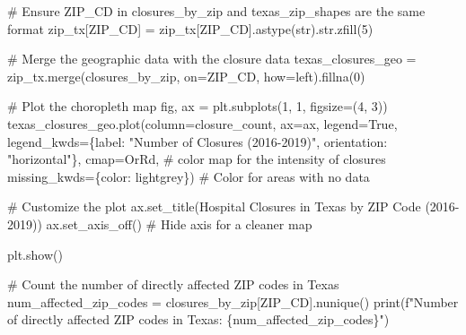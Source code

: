 \documentclass[
  letterpaper,
  DIV=11,
  numbers=noendperiod]{scrartcl}
\newenvironment{Shaded}{\begin{snugshade}}{\end{snugshade}}
\newcommand{\BuiltInTok}[1]{\textcolor[rgb]{0.00,0.23,0.31}{#1}}
\newcommand{\CommentTok}[1]{\textcolor[rgb]{0.37,0.37,0.37}{#1}}
\newcommand{\DecValTok}[1]{\textcolor[rgb]{0.68,0.00,0.00}{#1}}
\newcommand{\NormalTok}[1]{\textcolor[rgb]{0.00,0.23,0.31}{#1}}
\newcommand{\OperatorTok}[1]{\textcolor[rgb]{0.37,0.37,0.37}{#1}}
\newcommand{\SpecialCharTok}[1]{\textcolor[rgb]{0.37,0.37,0.37}{#1}}
\newcommand{\SpecialStringTok}[1]{\textcolor[rgb]{0.13,0.47,0.30}{#1}}
\newcommand{\StringTok}[1]{\textcolor[rgb]{0.13,0.47,0.30}{#1}}
\newcommand{\VariableTok}[1]{\textcolor[rgb]{0.07,0.07,0.07}{#1}}
\begin{document}
\begin{Shaded}
\begin{Highlighting}[]
\CommentTok{\# Ensure ZIP\_CD in closures\_by\_zip and texas\_zip\_shapes are the same format}
\NormalTok{zip\_tx[}\StringTok{\textquotesingle{}ZIP\_CD\textquotesingle{}}\NormalTok{] }\OperatorTok{=}\NormalTok{ zip\_tx[}\StringTok{\textquotesingle{}ZIP\_CD\textquotesingle{}}\NormalTok{].astype(}\BuiltInTok{str}\NormalTok{).}\BuiltInTok{str}\NormalTok{.zfill(}\DecValTok{5}\NormalTok{)}

\CommentTok{\# Merge the geographic data with the closure data}
\NormalTok{texas\_closures\_geo }\OperatorTok{=}\NormalTok{ zip\_tx.merge(closures\_by\_zip, on}\OperatorTok{=}\StringTok{\textquotesingle{}ZIP\_CD\textquotesingle{}}\NormalTok{, how}\OperatorTok{=}\StringTok{\textquotesingle{}left\textquotesingle{}}\NormalTok{).fillna(}\DecValTok{0}\NormalTok{)}

\CommentTok{\# Plot the choropleth map}
\NormalTok{fig, ax }\OperatorTok{=}\NormalTok{ plt.subplots(}\DecValTok{1}\NormalTok{, }\DecValTok{1}\NormalTok{, figsize}\OperatorTok{=}\NormalTok{(}\DecValTok{4}\NormalTok{, }\DecValTok{3}\NormalTok{))}
\NormalTok{texas\_closures\_geo.plot(column}\OperatorTok{=}\StringTok{\textquotesingle{}closure\_count\textquotesingle{}}\NormalTok{, ax}\OperatorTok{=}\NormalTok{ax, legend}\OperatorTok{=}\VariableTok{True}\NormalTok{,}
\NormalTok{                        legend\_kwds}\OperatorTok{=}\NormalTok{\{}\StringTok{\textquotesingle{}label\textquotesingle{}}\NormalTok{: }\StringTok{"Number of Closures (2016{-}2019)"}\NormalTok{, }\StringTok{\textquotesingle{}orientation\textquotesingle{}}\NormalTok{: }\StringTok{"horizontal"}\NormalTok{\},}
\NormalTok{                        cmap}\OperatorTok{=}\StringTok{\textquotesingle{}OrRd\textquotesingle{}}\NormalTok{,  }\CommentTok{\# color map for the intensity of closures}
\NormalTok{                        missing\_kwds}\OperatorTok{=}\NormalTok{\{}\StringTok{\textquotesingle{}color\textquotesingle{}}\NormalTok{: }\StringTok{\textquotesingle{}lightgrey\textquotesingle{}}\NormalTok{\})  }\CommentTok{\# Color for areas with no data}

\CommentTok{\# Customize the plot}
\NormalTok{ax.set\_title(}\StringTok{\textquotesingle{}Hospital Closures in Texas by ZIP Code (2016{-}2019)\textquotesingle{}}\NormalTok{)}
\NormalTok{ax.set\_axis\_off()  }\CommentTok{\# Hide axis for a cleaner map}

\NormalTok{plt.show()}

\CommentTok{\# Count the number of directly affected ZIP codes in Texas}
\NormalTok{num\_affected\_zip\_codes }\OperatorTok{=}\NormalTok{ closures\_by\_zip[}\StringTok{\textquotesingle{}ZIP\_CD\textquotesingle{}}\NormalTok{].nunique()}
\BuiltInTok{print}\NormalTok{(}\SpecialStringTok{f"Number of directly affected ZIP codes in Texas: }\SpecialCharTok{\{}\NormalTok{num\_affected\_zip\_codes}\SpecialCharTok{\}}\SpecialStringTok{"}\NormalTok{)}
\end{Highlighting}
\end{Shaded}
\end{document}
